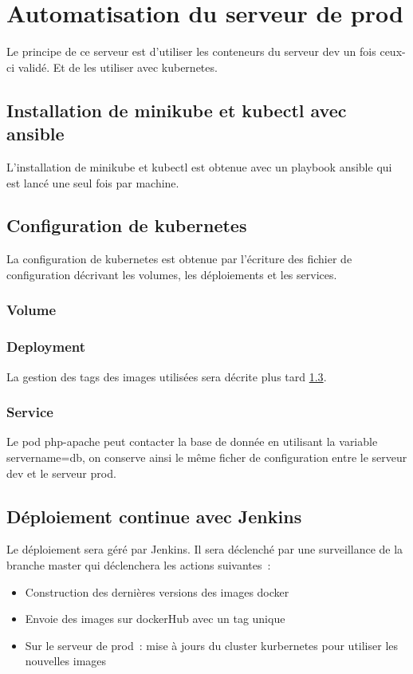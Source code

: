 ﻿\section{Automatisation du serveur de prod}
Le principe de ce serveur est d'utiliser les conteneurs du serveur dev un fois ceux-ci validé.
Et de les utiliser avec kubernetes.

\subsection{Installation de minikube et kubectl avec ansible}
L'installation de minikube et kubectl est obtenue avec  un playbook ansible qui est lancé une seul fois par machine.



\subsection{Configuration de kubernetes}
La configuration de kubernetes est obtenue par l'écriture des fichier de configuration décrivant les volumes, les déploiements et les services.

\subsubsection{Volume}



\subsubsection{Deployment}
La gestion des tags des images utilisées sera décrite plus tard \ref{prod_jenkins}.


\subsubsection{Service}
Le pod php-apache peut contacter la base de donnée en utilisant la variable servername=db,
on conserve ainsi le même ficher de configuration entre le serveur dev et le serveur prod.





\subsection{Déploiement continue avec Jenkins}
\label{prod_jenkins}
Le déploiement sera géré par Jenkins.
Il sera déclenché par une surveillance de la branche master qui déclenchera les actions suivantes~:
\begin{itemize}
\item Construction des dernières versions des images docker
\item Envoie des images sur dockerHub avec un tag unique
\item Sur le serveur de prod~: mise à jours du cluster kurbernetes pour utiliser les nouvelles images
\end{itemize}

